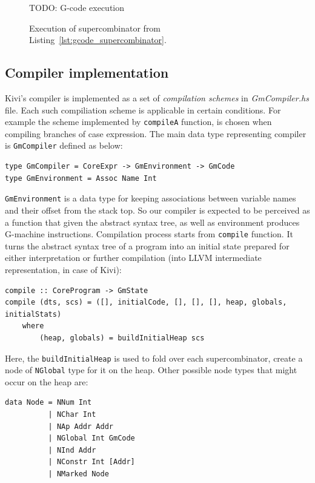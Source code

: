 \documentclass[12pt,a4paper]{report}
\begin{document}
\begin{figure}[h!]
  \centering

  TODO: G-code execution

  \caption{Execution of supercombinator from Listing~\ref{lst:gcode_supercombinator}.}
  \label{fig:gcode_execution}
\end{figure}

\subsection{Compiler implementation}
Kivi's compiler is implemented as a set of \textit{compilation schemes} in
\textit{GmCompiler.hs} file. Each such compiliation scheme is applicable in
certain conditions. For example the scheme implemented by \texttt{compileA}
function, is chosen when compiling branches of case expression. The main data
type representing compiler is \texttt{GmCompiler} defined as below:

\vspace*{0.2in}
\begin{lstlisting}[style=haskell]
type GmCompiler = CoreExpr -> GmEnvironment -> GmCode
type GmEnvironment = Assoc Name Int
\end{lstlisting}

\texttt{GmEnvironment} is a data type for keeping associations between variable
names and their offset from the stack top. So our compiler is expected to be
perceived as a function that given the abstract syntax tree, as well as
environment produces G-machine instructions. Compilation process starts from
\texttt{compile} function. It turns the abstract syntax tree of a program into
an initial state prepared for either interpretation or further compilation (into
LLVM intermediate representation, in case of Kivi):

\vspace*{0.2in}
\begin{lstlisting}[style=haskell]
compile :: CoreProgram -> GmState
compile (dts, scs) = ([], initialCode, [], [], [], heap, globals, initialStats)
    where
        (heap, globals) = buildInitialHeap scs
\end{lstlisting}

Here, the \texttt{buildInitialHeap} is used to fold over each supercombinator,
create a node of \texttt{NGlobal} type for it on the heap. Other possible node
types that might occur on the heap are:

\vspace*{0.2in}
\begin{lstlisting}[style=haskell]
data Node = NNum Int
          | NChar Int
          | NAp Addr Addr
          | NGlobal Int GmCode
          | NInd Addr
          | NConstr Int [Addr]
          | NMarked Node
\end{lstlisting}
\end{document}
